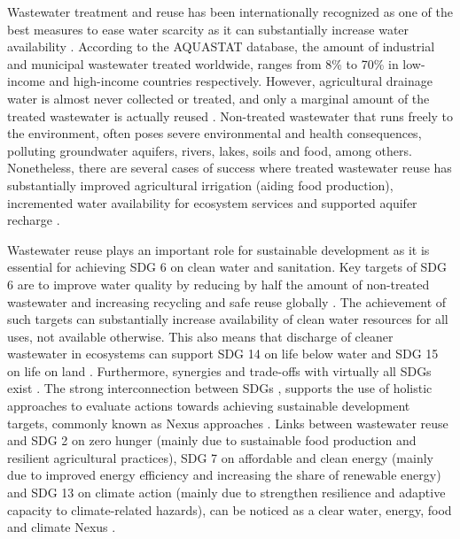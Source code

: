 Wastewater treatment and reuse has been internationally recognized as one of the best measures to ease water scarcity as it can substantially increase water availability \cite{unescoWastewaterUntappedResource2017,GARCIA2015154}. According to the AQUASTAT database, the amount of industrial and municipal wastewater treated worldwide, ranges from 8\% to 70\% in low-income and high-income countries respectively. However, agricultural drainage water is almost never collected or treated, and only a marginal amount of the treated wastewater is actually reused \cite{unescoWastewaterUntappedResource2017}. Non-treated wastewater that runs freely to the environment, often poses severe environmental and health consequences, polluting groundwater aquifers, rivers, lakes, soils and food, among others. Nonetheless, there are several cases of success where treated wastewater reuse has substantially improved agricultural irrigation (aiding food production), incremented water availability for ecosystem services and supported aquifer recharge \cite{hettiarachchiSAFEUSEWASTEWATERa, halalshehPolicyGovernanceFramework2018, mahjoubPublicAcceptanceWastewater2018, zuurbierUseWastewaterManaged2018, hussainSustainableUseManagement2019}.

Wastewater reuse plays an important role for sustainable development as it is essential for achieving SDG 6 on clean water and sanitation. Key targets of SDG 6 are to improve water quality by reducing by half the amount of non-treated wastewater and increasing recycling and safe reuse globally \cite{UNSDGs2019, tortajadaContributionsRecycledWastewater2020}. The achievement of such targets can substantially increase availability of clean water resources for all uses, not available otherwise. This also means that discharge of cleaner wastewater in ecosystems can support SDG 14 on life below water and SDG 15 on life on land \cite{UNSDGs2019, tortajadaContributionsRecycledWastewater2020}. Furthermore, synergies and trade-offs with virtually all SDGs exist \cite{WaterSanitationInterlinkages2016}. The strong interconnection between SDGs \cite{WaterSanitationInterlinkages2016,fusoneriniMappingSynergiesTradeoffs2018,fusoneriniConnectingClimateAction2019}, supports the use of holistic approaches to evaluate actions towards achieving sustainable development targets, commonly known as Nexus approaches \cite{liuNexusApproachesGlobal2018,bleischwitzResourceNexusPerspectives2018,olawuyiSustainableDevelopmentWaterenergyfood2020,simpsonDevelopmentWaterEnergyFoodNexus2019,hoffNexusApproachMENA2019}. Links between wastewater reuse and SDG 2 on zero hunger (mainly due to sustainable food production and resilient agricultural practices), SDG 7 on affordable and clean energy (mainly due to improved energy efficiency and increasing the share of renewable energy) and SDG 13 on climate action (mainly due to strengthen resilience and adaptive capacity to climate-related hazards), can be noticed as a clear water, energy, food and climate Nexus \cite{WaterSanitationInterlinkages2016,liuNexusApproachesGlobal2018,hoffNexusApproachMENA2019}.

